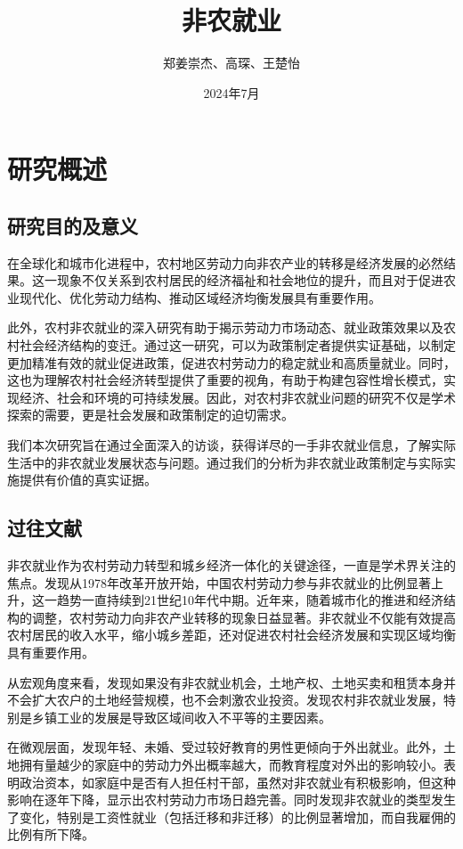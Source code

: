 \documentclass[12pt]{article}
\title{非农就业}
\author{郑姜崇杰、高琛、王楚怡}
\date{2024年7月}
\begin{document}
\maketitle

\section{研究概述}
\subsection*{研究目的及意义}
在全球化和城市化进程中，农村地区劳动力向非农产业的转移是经济发展的必然结果。这一现象不仅关系到农村居民的经济福祉和社会地位的提升，而且对于促进农业现代化、优化劳动力结构、推动区域经济均衡发展具有重要作用。

此外，农村非农就业的深入研究有助于揭示劳动力市场动态、就业政策效果以及农村社会经济结构的变迁。通过这一研究，可以为政策制定者提供实证基础，以制定更加精准有效的就业促进政策，促进农村劳动力的稳定就业和高质量就业。同时，这也为理解农村社会经济转型提供了重要的视角，有助于构建包容性增长模式，实现经济、社会和环境的可持续发展。因此，对农村非农就业问题的研究不仅是学术探索的需要，更是社会发展和政策制定的迫切需求。

我们本次研究旨在通过全面深入的访谈，获得详尽的一手非农就业信息，了解实际生活中的非农就业发展状态与问题。通过我们的分析为非农就业政策制定与实际实施提供有价值的真实证据。

\subsection*{过往文献}
非农就业作为农村劳动力转型和城乡经济一体化的关键途径，一直是学术界关注的焦点。\cite{zhang2018off}发现从1978年改革开放开始，中国农村劳动力参与非农就业的比例显著上升，这一趋势一直持续到21世纪10年代中期。近年来，随着城市化的推进和经济结构的调整，农村劳动力向非农产业转移的现象日益显著\cite{sheng2022boosting}。非农就业不仅能有效提高农村居民的收入水平，缩小城乡差距，还对促进农村社会经济发展和实现区域均衡具有重要作用。

从宏观角度来看，\cite{钟甫宁2009土地产权}发现如果没有非农就业机会，土地产权、土地买卖和租赁本身并不会扩大农户的土地经营规模，也不会刺激农业投资。\cite{张平1998中国农村居民区域间收入不平等与非农就业}发现农村非农就业发展，特别是乡镇工业的发展是导致区域间收入不平等的主要因素。

在微观层面，\cite{赵耀辉1997中国农村劳动力流动及教育在其中的作用}发现年轻、未婚、受过较好教育的男性更倾向于外出就业。此外，土地拥有量越少的家庭中的劳动力外出概率越大，而教育程度对外出的影响较小。\cite{王卫东2020人力资本}表明政治资本，如家庭中是否有人担任村干部，虽然对非农就业有积极影响，但这种影响在逐年下降，显示出农村劳动力市场日趋完善。同时\cite{zhang2018off}发现非农就业的类型发生了变化，特别是工资性就业（包括迁移和非迁移）的比例显著增加，而自我雇佣的比例有所下降。
\end{document}
